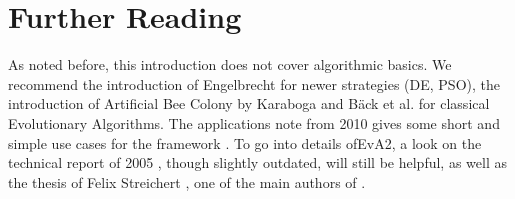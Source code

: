 \chapter{Further Reading\label{sec:Further-Reading}}

As noted before, this introduction does not cover algorithmic basics.
We recommend the introduction of Engelbrecht \cite{Engelbrecht07CI}
for newer strategies (DE, PSO), the introduction of Artificial Bee Colony by Karaboga \cite{Karaboga2007} and Bäck et al. \cite{Baeck99EC1}
for classical Evolutionary Algorithms. The applications note from
2010 gives some short and simple use cases for the framework \cite{Kron10EvA2}.
To go into details of\noun{ }EvA2, a look on the technical report
of 2005 \cite{JOptDocumentation}, though slightly outdated, will
still be helpful, as well as the thesis of Felix Streichert \cite{Streichert07},
one of the main authors of .